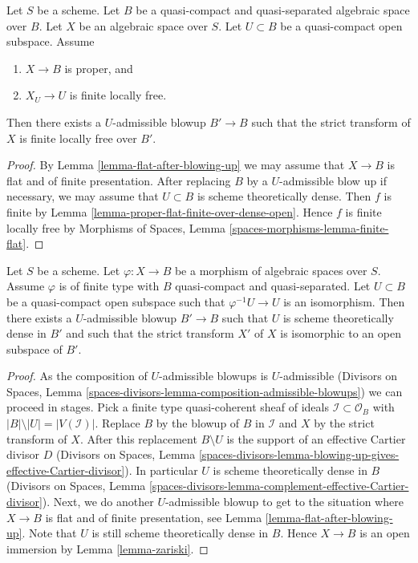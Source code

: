 \begin{lemma}
\label{lemma-finite-after-blowing-up}
Let $S$ be a scheme. Let $B$ be a quasi-compact and quasi-separated
algebraic space over $B$. Let $X$ be an algebraic space over $S$.
Let $U \subset B$ be a quasi-compact open subspace. Assume
\begin{enumerate}
\item $X \to B$ is proper, and
\item $X_U \to U$ is finite locally free.
\end{enumerate}
Then there exists a $U$-admissible blowup $B' \to B$ such that
the strict transform of $X$ is finite locally free over $B'$.
\end{lemma}

\begin{proof}
By Lemma \ref{lemma-flat-after-blowing-up} we may assume that
$X \to B$ is flat and of finite presentation. After replacing
$B$ by a $U$-admissible blow up if necessary, we may assume
that $U \subset B$ is scheme theoretically dense. Then $f$ is
finite by Lemma \ref{lemma-proper-flat-finite-over-dense-open}.
Hence $f$ is finite locally free by
Morphisms of Spaces, Lemma \ref{spaces-morphisms-lemma-finite-flat}.
\end{proof}

\begin{lemma}
\label{lemma-zariski-after-blowup}
Let $S$ be a scheme.
Let $\varphi : X \to B$ be a morphism of algebraic spaces over $S$.
Assume $\varphi$ is of finite type with $B$ quasi-compact and quasi-separated.
Let $U \subset B$ be a quasi-compact open subspace such that
$\varphi^{-1}U \to U$ is an isomorphism. Then there exists a $U$-admissible
blowup $B' \to B$ such that $U$ is scheme theoretically dense in $B'$
and such that the strict transform $X'$ of $X$ is isomorphic
to an open subspace of $B'$.
\end{lemma}

\begin{proof}
As the composition of $U$-admissible blowups is $U$-admissible
(Divisors on Spaces, Lemma
\ref{spaces-divisors-lemma-composition-admissible-blowups})
we can proceed in stages. Pick a finite type quasi-coherent sheaf
of ideals $\mathcal{I} \subset \mathcal{O}_B$ with
$|B| \setminus |U| = |V(\mathcal{I})|$. Replace $B$ by the blowup
of $B$ in $\mathcal{I}$ and $X$ by the strict transform of $X$.
After this replacement $B \setminus U$ is the support of an effective
Cartier divisor $D$ (Divisors on Spaces, Lemma
\ref{spaces-divisors-lemma-blowing-up-gives-effective-Cartier-divisor}).
In particular $U$ is scheme theoretically dense in $B$
(Divisors on Spaces, Lemma
\ref{spaces-divisors-lemma-complement-effective-Cartier-divisor}).
Next, we do another $U$-admissible blowup to get to the situation where
$X \to B$ is flat and of finite presentation, see
Lemma \ref{lemma-flat-after-blowing-up}. Note that $U$ is still scheme
theoretically dense in $B$. Hence $X \to B$ is an open immersion by
Lemma \ref{lemma-zariski}.
\end{proof}

